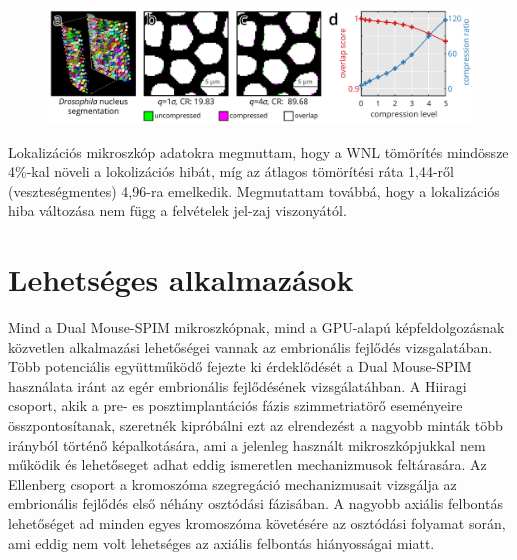\documentclass{booklet_style}
\begin{document}
    \begin{figure}
      \centering
      \includegraphics[page=1,width=\textwidth]{4_gpu/LLvsB3D}
      \label{fig:wnlDroso}
    \end{figure}

    Lokalizációs mikroszkóp adatokra megmuttam, hogy a WNL tömörítés mindössze 4\%-kal növeli a lokolizációs hibát, míg az átlagos tömörítési ráta 1,44-ről (veszteségmentes) 4,96-ra emelkedik. Megmutattam továbbá, hogy a lokalizációs hiba változása nem függ a felvételek jel-zaj viszonyától.

    


\section{Lehetséges alkalmazások}
Mind a Dual Mouse-SPIM mikroszkópnak, mind a GPU-alapú képfeldolgozásnak közvetlen alkalmazási lehetőségei vannak az embrionális fejlődés vizsgalatában. Több potenciális együttműködő fejezte ki érdeklődését a Dual Mouse-SPIM használata iránt az egér embrionális fejlődésének vizsgálatáhban. A Hiiragi
csoport, akik a pre- es posztimplantációs fázis szimmetriatörő eseményeire összpontosítanak, szeretnék kipróbálni ezt az elrendezést a nagyobb minták több irányból történő képalkotására, ami a jelenleg használt mikroszkópjukkal nem működik és lehetőseget adhat eddig ismeretlen mechanizmusok feltárasára. Az Ellenberg csoport a kromoszóma szegregáció mechanizmusait vizsgálja az embrionális fejlődés első néhány osztódási fázisában. A nagyobb axiális felbontás lehetőséget ad minden egyes kromoszóma követésére az osztódási folyamat során, ami eddig nem volt lehetséges az axiális felbontás hiányosságai miatt.
\end{document}
